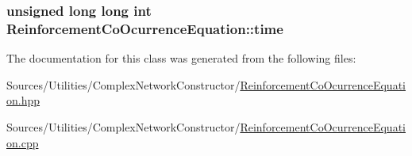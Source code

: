 \hypertarget{class_reinforcement_co_ocurrence_equation_a12eb56a8fb3b21e292b9cd5030efda0f}{
\subsubsection[{time}]{\setlength{\rightskip}{0pt plus 5cm}unsigned long long int Reinforcement\+Co\+Ocurrence\+Equation\+::time\hspace{0.3cm}{\ttfamily [private]}}}\label{class_reinforcement_co_ocurrence_equation_a12eb56a8fb3b21e292b9cd5030efda0f}


The documentation for this class was generated from the following files\+:\begin{DoxyCompactItemize}
\item 
Sources/\+Utilities/\+Complex\+Network\+Constructor/\hyperlink{_reinforcement_co_ocurrence_equation_8hpp}{Reinforcement\+Co\+Ocurrence\+Equation.\+hpp}\item 
Sources/\+Utilities/\+Complex\+Network\+Constructor/\hyperlink{_reinforcement_co_ocurrence_equation_8cpp}{Reinforcement\+Co\+Ocurrence\+Equation.\+cpp}\end{DoxyCompactItemize}

